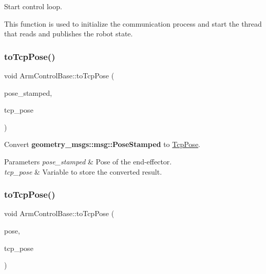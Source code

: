 Start control loop. 

This function is used to initialize the communication process and start the thread that reads and publishes the robot state. \mbox{\label{classArmControlBase_a5163e7091cd7d1a9a12121cfaefc6330}} 
\subsubsection{\texorpdfstring{to\+Tcp\+Pose()}{toTcpPose()}\hspace{0.1cm}{\footnotesize\ttfamily [1/2]}}
{\footnotesize\ttfamily void Arm\+Control\+Base\+::to\+Tcp\+Pose (\begin{DoxyParamCaption}\item[{const geometry\+\_\+msgs\+::msg\+::\+Pose\+Stamped \&}]{pose\+\_\+stamped,  }\item[{\hyperlink{structTcpPose}{Tcp\+Pose} \&}]{tcp\+\_\+pose }\end{DoxyParamCaption})}



Convert {\bfseries geometry\+\_\+msgs\+::msg\+::\+Pose\+Stamped} to \hyperlink{structTcpPose}{Tcp\+Pose}. 


\begin{DoxyParams}{Parameters}
{\em pose\+\_\+stamped} & Pose of the end-\/effector. \\
\hline
{\em tcp\+\_\+pose} & Variable to store the converted result. \\
\hline
\end{DoxyParams}
\mbox{\label{classArmControlBase_a559aee5d6ea56cf5fba7e61c13b3ba8f}} 
\subsubsection{\texorpdfstring{to\+Tcp\+Pose()}{toTcpPose()}\hspace{0.1cm}{\footnotesize\ttfamily [2/2]}}
{\footnotesize\ttfamily void Arm\+Control\+Base\+::to\+Tcp\+Pose (\begin{DoxyParamCaption}\item[{const Eigen\+::\+Isometry3d \&}]{pose,  }\item[{\hyperlink{structTcpPose}{Tcp\+Pose} \&}]{tcp\+\_\+pose }\end{DoxyParamCaption})}



